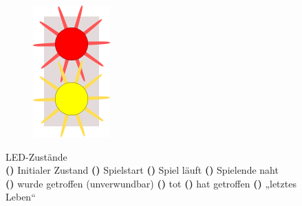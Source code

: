 \begin{figure}[h]
\begin{subfigure}[b]{0.06\textwidth}
    \includegraphics[width=\textwidth,keepaspectratio]
                    {./040-komponenten/010-hardware/led-red-yellow-blink.png}
    \caption{\label{fig:led-red-yellow-blink}}
  \end{subfigure}
  \caption{LED-Zustände \\ \small
           \textbf{()} Initialer Zustand
           \textbf{()} Spielstart
           \textbf{()} Spiel läuft
           \textbf{()} Spielende naht \\
           \textbf{()} wurde getroffen (unverwundbar)
           \textbf{()} tot
           \textbf{()} hat getroffen
           \textbf{()} „letztes Leben“}
  \label{fig:leds}
\end{figure}
